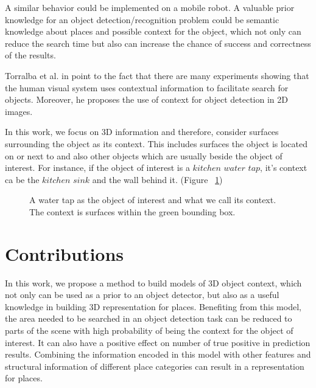 A similar behavior could be implemented on a mobile robot. 
A valuable prior knowledge for an object detection/recognition problem could be semantic knowledge about places and possible context for the object, 
which not only can reduce the search time but also can increase the chance of success and correctness of the results.

Torralba et al. in \cite{eyeMovement} point to the fact that there are many experiments showing that the human visual system uses 
contextual information to facilitate search for objects. 
Moreover, he proposes the use of context for object detection in 2D images.

In this work, we focus on 3D information and therefore, consider surfaces surrounding the object as its context.
This includes surfaces the object is located on or next to and also other objects which are usually
beside the object of interest. 
For instance, if the object of interest is a $kitchen$ $water$ $tap$, it's context ca be the 
$kitchen$ $sink$ and the wall behind it. (Figure ~\ref{contextExample.figure})

\begin{figure}[t]
  \caption[Illustration of a sample Context.]
  {A water tap as the object of interest and what we call its context. The context is surfaces within the green 
  bounding box.}
  \label{contextExample.figure}
\end{figure}

\section {Contributions}
\label{Contributions.sec}

In this work, we propose a method to build models of 3D object context, which not only can be used as a prior to an 
object detector, but also as a useful knowledge in building 3D representation for places. 
Benefiting from this model, the area needed to be searched in an object detection task can be reduced to parts of the scene with high 
probability of being the context for the object of interest. 
It can also have a positive effect on number of true positive in prediction results. 
Combining the information encoded in this model with other features and structural information of different place categories can 
result in a representation for places.
 
